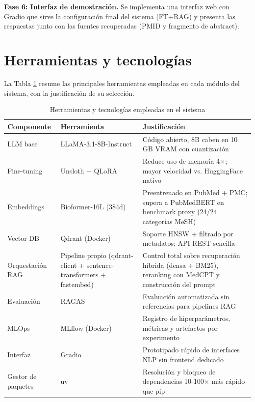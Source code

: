 \documentclass[11pt,a4paper,spanish]{book}
\numberwithin{equation}{chapter}
\numberwithin{figure}{chapter}
\begin{document}
\textbf{Fase 6: Interfaz de demostración.} Se implementa una interfaz web con Gradio que sirve la configuración final del sistema (FT+RAG) y presenta las respuestas junto con las fuentes recuperadas (PMID y fragmento de abstract).

\section{Herramientas y tecnologías}

La Tabla \ref{tab:tools} resume las principales herramientas empleadas en cada módulo del sistema, con la justificación de su selección.

\begin{table}[h]
\centering
\begin{tabular}{|p{}|p{}|p{}|}
\hline
\textbf{Componente} & \textbf{Herramienta} & \textbf{Justificación} \\
\hline
LLM base & LLaMA-3.1-8B-Instruct & Código abierto, 8B caben en 10 GB VRAM con cuantización \\
Fine-tuning & Unsloth + QLoRA & Reduce uso de memoria 4$\times$; mayor velocidad vs. HuggingFace nativo \\
Embeddings & Bioformer-16L (384d) & Preentrenado en PubMed + PMC; supera a PubMedBERT en benchmark proxy (24/24 categorías MeSH) \\
Vector DB & Qdrant (Docker) & Soporte HNSW + filtrado por metadatos; API REST sencilla \\
Orquestación RAG & Pipeline propio (qdrant-client + sentence-transformers + fastembed) & Control total sobre recuperación híbrida (densa + BM25), reranking con MedCPT y construcción del prompt \\
Evaluación & RAGAS & Evaluación automatizada sin referencias para pipelines RAG \cite{es2025ragasautomatedevaluationretrieval} \\
MLOps & MLflow (Docker) & Registro de hiperparámetros, métricas y artefactos por experimento \\
Interfaz & Gradio & Prototipado rápido de interfaces NLP sin frontend dedicado \\
Gestor de paquetes & uv & Resolución y bloqueo de dependencias 10-100$\times$ más rápido que pip \\
\hline
\end{tabular}
\caption{Herramientas y tecnologías empleadas en el sistema}
\label{tab:tools}
\end{table}
\end{document}
